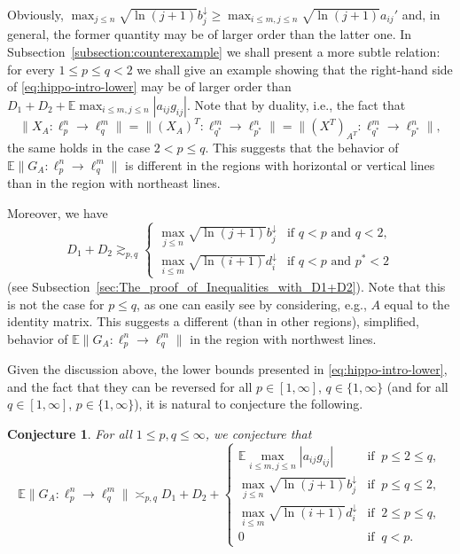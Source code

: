 \documentclass[a4paper]{amsart}
\newtheorem{conjecture}{Conjecture}[] %
\theoremstyle{definition}
\theoremstyle{remark}
\numberwithin{equation}{section}
\newcommand*{\EE}{\mathbb{E}}
\newcommand*{\rearr}{\downarrow} %
\begin{document}
Obviously,  $ \max_{j\le n}\sqrt{\ln (j+1)} b_j^{\rearr{}} \ge \max_{i\le m, j\le n}\sqrt{\ln (j+1)} a_{ij}'  $ and, in general, the former quantity may be of larger order than the latter one.
In Subsection~\ref{subsection:counterexample} we shall present a more subtle relation: for every $1\le p\le q< 2$ we shall give an example showing that the right-hand side of \eqref{eq:hippo-intro-lower} may be of larger order than $D_1+D_2+\EE \max_{i \le m,j\le n} |a_{ij}g_{ij}| $. Note that by duality, i.e., 
the fact that
	\begin{equation}	\label{eq:duality}
	 \|X_A\colon \ell_{p}^n\to\ell_q^m\| = \|(X_A)^T \colon \ell_{q^*}^m\to\ell_{p^*}^n \| =\|(X^T)_{A^T} \colon \ell_{q^*}^m\to\ell_{p^*}^n \| ,
	 \end{equation}
 the same holds in the case $2< p\le q$. This suggests that the behavior of $\EE\|G_A\colon \ell_p^n\to \ell_q^m\|$ is different in the regions with horizontal or vertical lines than in the region with northeast lines.


Moreover, we have
\begin{equation}
	\label{eq:bound_q<p_third_term_unnec}
D_1+D_2\gtrsim_{p,q}
\begin{cases}
\max_{j\le n}\sqrt{\ln (j+1)} b_j^{\rearr{}}  &  \text{if }  q< p \text{ and } q<2, \\
  \max_{i\le m}\sqrt{\ln (i+1)} d_i^{\rearr{}}&   \text{if } q <p \text{ and } p^\ast<2
\end{cases}
\end{equation}
(see Subsection~\ref{sec:The_proof_of_Inequalities_with_D1+D2}).
 Note that this is not the case for $p \le q$, as one can easily see by considering, e.g., $A$ equal to the identity matrix. 
 This suggests a different (than in other regions), simplified, behavior of $\EE\|G_A\colon \ell_p^n\to \ell_q^m\|$  in the region with northwest lines.



Given the discussion above, the lower bounds presented in \eqref{eq:hippo-intro-lower}, and the fact that they can be reversed for all $p\in[1,\infty]$, $q\in \{1,\infty\}$ (and for all $q\in[1,\infty]$,  $p\in \{1,\infty\}$), it is natural to conjecture the following.


\begin{conjecture}\label{conj:conjecture_1}
For all $1\le p, q \le \infty$,
we conjecture that
\begin{equation} \label{eq:hippo}
\EE \|G_A\colon \ell_{p}^n\to\ell_q^m\|
\asymp_{p,q} D_1+D_2 +
\begin{cases}
  \EE \max_{i \le m,j\le n} |a_{ij}g_{ij}| &  \text{if }\  p\leq 2\leq q,\\
  \max_{j\le n}\sqrt{\ln (j+1)} b_j^{\rearr{}}  &    \text{if }\ p\leq q\leq 2,\\
  \max_{i\le m}\sqrt{\ln (i+1)} d_i^{\rearr{}}&   \text{if } \ 2\leq p \leq q,\\
  0 &   \textrm{if } \ q<p.
\end{cases} 
\end{equation}
\end{conjecture}
\end{document}
